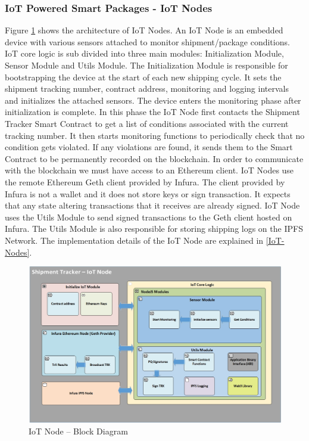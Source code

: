 \subsubsection{IoT Powered Smart Packages - IoT Nodes} \label{IoTNode} 
Figure \ref{fig:ArchitectureIoT} shows the architecture of IoT Nodes. An IoT Node is an embedded device with various sensors attached to monitor shipment/package conditions. IoT core logic is sub divided into three main modules: Initialization Module, Sensor Module and Utils Module. The Initialization Module is responsible for bootstrapping the device at the start of each new shipping cycle. It sets the shipment tracking number, contract address, monitoring and logging intervals and initializes the attached sensors. The device enters the monitoring phase after initialization is complete. In this phase the IoT Node first contacts the Shipment Tracker Smart Contract to get a list of conditions associated with the current tracking number. It then starts monitoring functions to periodically check that no condition gets violated. If any violations are found, it sends them to the Smart Contract to be permanently recorded on the blockchain. In order to communicate with the blockchain we must have access to an Ethereum client. IoT Nodes use the remote Ethereum Geth client provided by Infura. The client provided by Infura is not a wallet and it does not store keys or sign transaction. It expects that any state altering transactions that it receives are already signed. IoT Node uses the Utils Module to send signed transactions to the Geth client hosted on Infura. The Utils Module is also responsible for storing shipping logs on the IPFS Network.  The implementation details of the IoT Node are explained in \ref{IoT-Nodes}.

\begin{figure}[h]
	\centering
    \includegraphics[width=180mm,scale=1]{figs/IoTNode-BD}
	\caption{IoT Node – Block Diagram}
	\label{fig:ArchitectureIoT} 
\end{figure}
\clearpage

